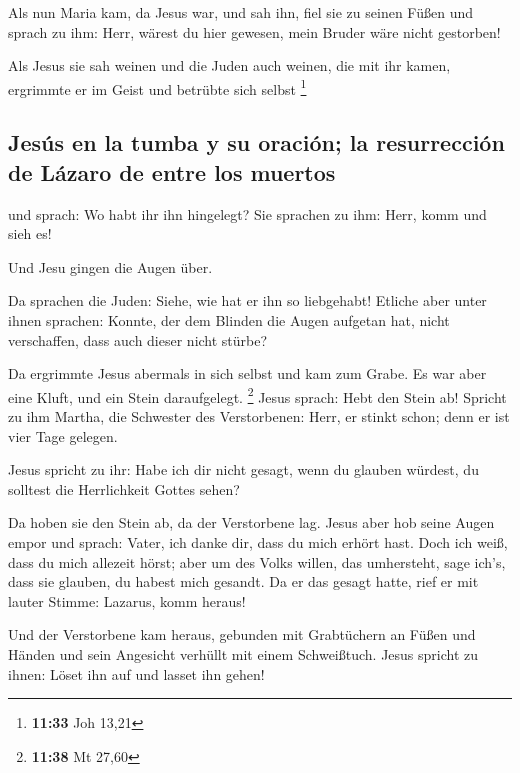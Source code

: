  Als nun Maria kam, da Jesus war, und sah ihn, fiel sie
zu seinen Füßen und sprach zu ihm: Herr, wärest du hier gewesen, mein
Bruder wäre nicht gestorben!

 Als Jesus sie sah weinen und die Juden auch weinen, die
mit ihr kamen, ergrimmte er im Geist und betrübte sich selbst
\footnote{\textbf{11:33} Joh 13,21}

\hypertarget{jesuxfas-en-la-tumba-y-su-oraciuxf3n-la-resurrecciuxf3n-de-luxe1zaro-de-entre-los-muertos}{%
\subsection{Jesús en la tumba y su oración; la resurrección de Lázaro de
entre los
muertos}\label{jesuxfas-en-la-tumba-y-su-oraciuxf3n-la-resurrecciuxf3n-de-luxe1zaro-de-entre-los-muertos}}

 und sprach: Wo habt ihr ihn hingelegt? Sie sprachen zu
ihm: Herr, komm und sieh es!

 Und Jesu gingen die Augen über.

 Da sprachen die Juden: Siehe, wie hat er ihn so
liebgehabt!  Etliche aber unter ihnen sprachen: Konnte,
der dem Blinden die Augen aufgetan hat, nicht verschaffen, dass auch
dieser nicht stürbe?

 Da ergrimmte Jesus abermals in sich selbst und kam zum
Grabe. Es war aber eine Kluft, und ein Stein daraufgelegt. \footnote{\textbf{11:38}
  Mt 27,60}  Jesus sprach: Hebt den Stein ab! Spricht zu
ihm Martha, die Schwester des Verstorbenen: Herr, er stinkt schon; denn
er ist vier Tage gelegen.

 Jesus spricht zu ihr: Habe ich dir nicht gesagt, wenn du
glauben würdest, du solltest die Herrlichkeit Gottes sehen?

 Da hoben sie den Stein ab, da der Verstorbene lag. Jesus
aber hob seine Augen empor und sprach: Vater, ich danke dir, dass du
mich erhört hast.  Doch ich weiß, dass du mich allezeit
hörst; aber um des Volks willen, das umhersteht, sage ich's, dass sie
glauben, du habest mich gesandt.  Da er das gesagt hatte,
rief er mit lauter Stimme: Lazarus, komm heraus!

 Und der Verstorbene kam heraus, gebunden mit Grabtüchern
an Füßen und Händen und sein Angesicht verhüllt mit einem Schweißtuch.
Jesus spricht zu ihnen: Löset ihn auf und lasset ihn gehen!


